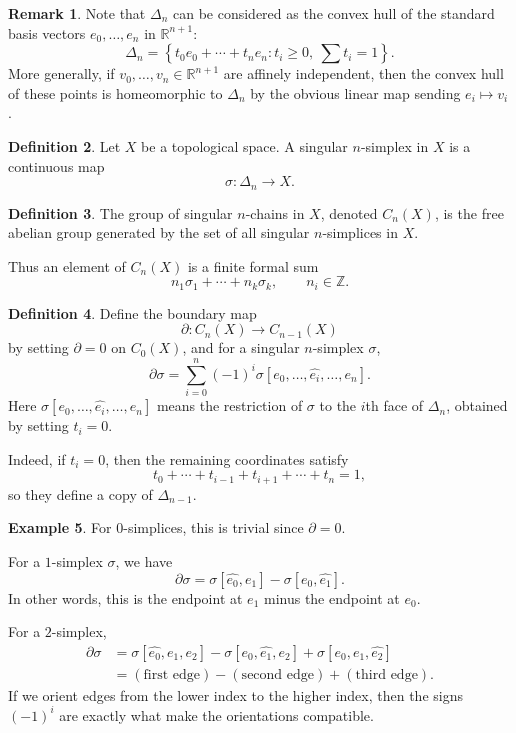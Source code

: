 \documentclass[11pt,a4paper]{article}
\theoremstyle{definition}
\newtheorem{definition}{Definition}[section]
\newtheorem{example}[definition]{Example}
\newtheorem{remark}[definition]{Remark}
\theoremstyle{plain}
\theoremstyle{remark}
\renewcommand{\set}[1]{\left\{ #1 \right\}}
\newcommand{\1}{\mathbbm{1}}
\begin{document}
\begin{remark}
    Note that $\Delta_n$ can be considered as the convex hull of the standard basis vectors
    $e_0,\dots,e_n$ in $\mathbb{R}^{n+1}$:
    \[
    \Delta_n = \set{t_0e_0+\cdots+t_ne_n \colon t_i \ge 0,\ \sum t_i = 1}.
    \]
    More generally, if $v_0,\dots,v_n \in \mathbb{R}^{n+1}$ are affinely independent, then the convex hull
    of these points is homeomorphic to $\Delta_n$ by the obvious linear map sending $e_i \mapsto v_i$.
\end{remark}

\begin{definition}
    Let $X$ be a topological space. A singular $n$-simplex in $X$ is a continuous map
    \[
    \sigma \colon \Delta_n \to X.
    \]
\end{definition}

\begin{definition}
    The group of singular $n$-chains in $X$, denoted $C_n(X)$, is the free abelian group generated by
    the set of all singular $n$-simplices in $X$.

    Thus an element of $C_n(X)$ is a finite formal sum
    \[
    n_1 \sigma_1 + \cdots + n_k \sigma_k, \qquad n_i \in \mathbb{Z}.
    \]
\end{definition}

\begin{definition}
    Define the boundary map
    \[
    \partial \colon C_n(X) \to C_{n-1}(X)
    \]
    by setting $\partial = 0$ on $C_0(X)$, and for a singular $n$-simplex $\sigma$,
    \[
    \partial \sigma = \sum_{i=0}^n (-1)^i \sigma[e_0,\dots,\hat{e_i},\dots,e_n].
    \]
    Here $\sigma[e_0,\dots,\hat{e_i},\dots,e_n]$ means the restriction of $\sigma$ to the $i$th face of $\Delta_n$,
    obtained by setting $t_i=0$.

    Indeed, if $t_i=0$, then the remaining coordinates satisfy
    \[
    t_0+\cdots+t_{i-1}+t_{i+1}+\cdots+t_n = 1,
    \]
    so they define a copy of $\Delta_{n-1}$.
\end{definition}

\begin{example}
    For $0$-simplices, this is trivial since $\partial=0$.

    For a $1$-simplex $\sigma$, we have
    \[
    \partial \sigma = \sigma[\hat{e_0},e_1] - \sigma[e_0,\hat{e_1}].
    \]
    In other words, this is the endpoint at $e_1$ minus the endpoint at $e_0$.

    For a $2$-simplex,
    \begin{align*}
        \partial \sigma
        &= \sigma[\hat{e_0},e_1,e_2] - \sigma[e_0,\hat{e_1},e_2] + \sigma[e_0,e_1,\hat{e_2}] \\
        &= (\text{first edge}) - (\text{second edge}) + (\text{third edge}).
    \end{align*}
    If we orient edges from the lower index to the higher index, then the signs $(-1)^i$ are exactly what make
    the orientations compatible.
\end{example}
\end{document}

